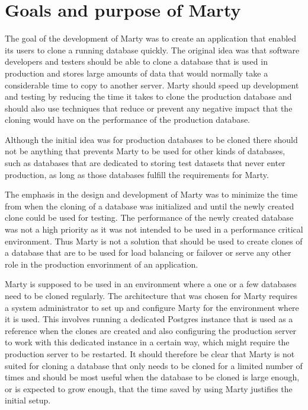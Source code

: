 \documentclass[a4paper,12pt,twoside,BCOR=10mm]{scrbook}
\begin{document}
\chapter{Goals and purpose of Marty}
The goal of the development of Marty was to create an application that enabled its users to clone a running database quickly. The original idea was that software developers and testers should be able to clone a database that is used in production and stores large amounts of data that would normally take a considerable time to copy to another server. Marty should speed up development and testing by reducing the time it takes to clone the production database and should also use techniques that reduce or prevent any negative impact that the cloning would have on the performance of the production database. 

Although the initial idea was for production databases to be cloned there should not be anything that prevents Marty to be used for other kinds of databases, such as databases that are dedicated to storing test datasets that never enter production, as long as those databases fulfill the requirements for Marty.

The emphasis in the design and development of Marty was to minimize the time from when the cloning of a database was initialized and until the newly created clone could be used for testing. The performance of the newly created database was not a high priority as it was not intended to be used in a performance critical environment. Thus Marty is not a solution that should be used to create clones of a database that are to be used for load balancing or failover or serve any other role in the production envorinment of an application.

Marty is supposed to be used in an environment where a one or a few databases need to be cloned regularly. The architecture that was chosen for Marty requires a system administrator to set up and configure Marty for the environment where it is used. This involves running a dedicated Postgres instance that is used as a reference when the clones are created and also configuring the production server to work with this dedicated instance in a certain way, which might require the production server to be restarted. It should therefore be clear that Marty is not suited for cloning a database that only needs to be cloned for a limited number of times and should be most useful when the database to be cloned is large enough, or is expected to grow enough, that the time saved by using Marty justifies the initial setup.
\end{document}

